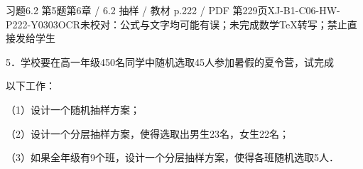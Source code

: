 \begin{bankitem}{习题6.2 第5题}{第6章 / 6.2 抽样 / 教材 p.222 / PDF 第229页}{XJ-B1-C06-HW-P222-Y0303}{OCR未校对：公式与文字均可能有误；未完成数学TeX转写；禁止直接发给学生}
\begin{ocrdraft}
\par
5．学校要在高一年级450名同学中随机选取45人参加暑假的夏令营，试完成
\par
以下工作：
\par
（1）设计一个随机抽样方案；
\par
（2）设计一个分层抽样方案，使得选取出男生23名，女生22名；
\par
（3）如果全年级有9个班，设计一个分层抽样方案，使得各班随机选取5人．
\end{ocrdraft}
\end{bankitem}
